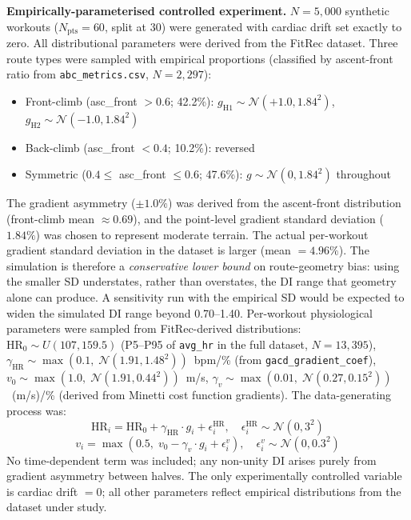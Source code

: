 \documentclass[times, twoside]{zHenriquesLab-StyleBioRxiv}
\begin{document}
\textbf{Empirically-parameterised controlled experiment.} $N = 5{,}000$ synthetic workouts ($N_{\text{pts}} = 60$, split at 30) were generated with cardiac drift set exactly to zero. All distributional parameters were derived from the FitRec dataset. Three route types were sampled with empirical proportions (classified by ascent-front ratio from \texttt{abc\_metrics.csv}, $N = 2{,}297$):
\begin{itemize}
  \item Front-climb (asc\_front $> 0.6$; 42.2\%): $g_{\text{H1}} \sim \mathcal{N}(+1.0, 1.84^2)$,\; $g_{\text{H2}} \sim \mathcal{N}(-1.0, 1.84^2)$
  \item Back-climb (asc\_front $< 0.4$; 10.2\%): reversed
  \item Symmetric ($0.4 \leq$ asc\_front $\leq 0.6$; 47.6\%): $g \sim \mathcal{N}(0, 1.84^2)$ throughout
\end{itemize}
The gradient asymmetry ($\pm 1.0\%$) was derived from the ascent-front distribution (front-climb mean $\approx 0.69$), and the point-level gradient standard deviation ($1.84\%$) was chosen to represent moderate terrain. The actual per-workout gradient standard deviation in the dataset is larger (mean $= 4.96\%$). The simulation is therefore a \textit{conservative lower bound} on route-geometry bias: using the smaller SD understates, rather than overstates, the DI range that geometry alone can produce. A sensitivity run with the empirical SD would be expected to widen the simulated DI range beyond 0.70--1.40. Per-workout physiological parameters were sampled from FitRec-derived distributions: $\text{HR}_0 \sim U(107, 159.5)$ (P5--P95 of \texttt{avg\_hr} in the full dataset, $N = 13{,}395$), $\gamma_{\text{HR}} \sim \max(0.1,\; \mathcal{N}(1.91, 1.48^2))$~bpm/\% (from \texttt{gacd\_gradient\_coef}), $v_0 \sim \max(1.0,\; \mathcal{N}(1.91, 0.44^2))$~m/s, $\gamma_v \sim \max(0.01,\; \mathcal{N}(0.27, 0.15^2))$~(m/s)/\% (derived from Minetti \cite{minetti2002} cost function gradients). The data-generating process was:
\[
  \text{HR}_i = \text{HR}_0 + \gamma_{\text{HR}} \cdot g_i + \epsilon^{\text{HR}}_i, \quad \epsilon^{\text{HR}}_i \sim \mathcal{N}(0, 3^2)
\]
\[
  v_i = \max\!\left(0.5,\; v_0 - \gamma_v \cdot g_i + \epsilon^v_i\right), \quad \epsilon^v_i \sim \mathcal{N}(0, 0.3^2)
\]
No time-dependent term was included; any non-unity DI arises purely from gradient asymmetry between halves. The only experimentally controlled variable is cardiac drift $= 0$; all other parameters reflect empirical distributions from the dataset under study.
\end{document}
